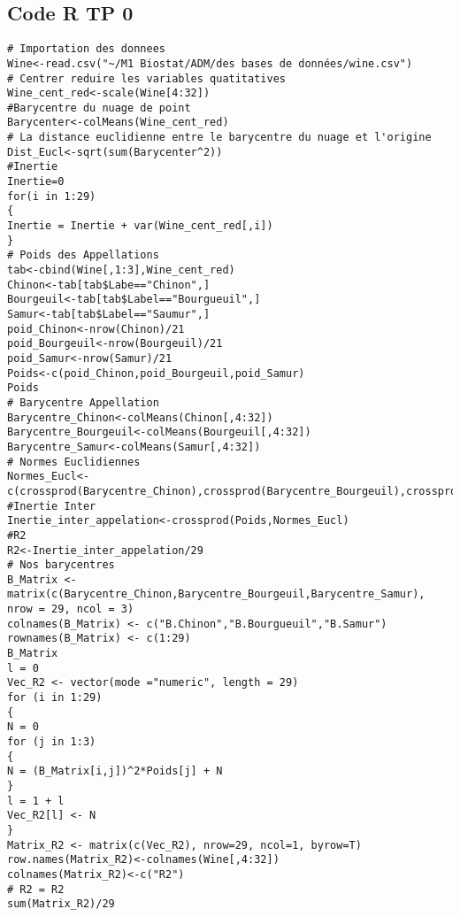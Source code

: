 \begin{appendices}
\chapter{Code R TP 0}
\label{Code R} 
\begin{lstlisting} 
# Importation des donnees
Wine<-read.csv("~/M1 Biostat/ADM/des bases de données/wine.csv")
# Centrer reduire les variables quatitatives
Wine_cent_red<-scale(Wine[4:32])
#Barycentre du nuage de point
Barycenter<-colMeans(Wine_cent_red)
# La distance euclidienne entre le barycentre du nuage et l'origine
Dist_Eucl<-sqrt(sum(Barycenter^2))
#Inertie
Inertie=0
for(i in 1:29)
{
Inertie = Inertie + var(Wine_cent_red[,i])
}
# Poids des Appellations
tab<-cbind(Wine[,1:3],Wine_cent_red)
Chinon<-tab[tab$Labe=="Chinon",]
Bourgeuil<-tab[tab$Label=="Bourgueuil",]
Samur<-tab[tab$Label=="Saumur",]
poid_Chinon<-nrow(Chinon)/21
poid_Bourgeuil<-nrow(Bourgeuil)/21
poid_Samur<-nrow(Samur)/21
Poids<-c(poid_Chinon,poid_Bourgeuil,poid_Samur)
Poids
# Barycentre Appellation
Barycentre_Chinon<-colMeans(Chinon[,4:32])
Barycentre_Bourgeuil<-colMeans(Bourgeuil[,4:32])
Barycentre_Samur<-colMeans(Samur[,4:32])
# Normes Euclidiennes
Normes_Eucl<-c(crossprod(Barycentre_Chinon),crossprod(Barycentre_Bourgeuil),crossprod(Barycentre_Samur))
#Inertie Inter
Inertie_inter_appelation<-crossprod(Poids,Normes_Eucl)
#R2
R2<-Inertie_inter_appelation/29
# Nos barycentres
B_Matrix <- matrix(c(Barycentre_Chinon,Barycentre_Bourgeuil,Barycentre_Samur), nrow = 29, ncol = 3)
colnames(B_Matrix) <- c("B.Chinon","B.Bourgueuil","B.Samur")
rownames(B_Matrix) <- c(1:29)
B_Matrix
l = 0
Vec_R2 <- vector(mode ="numeric", length = 29)
for (i in 1:29)
{
N = 0
for (j in 1:3)
{
N = (B_Matrix[i,j])^2*Poids[j] + N
}
l = 1 + l
Vec_R2[l] <- N
}
Matrix_R2 <- matrix(c(Vec_R2), nrow=29, ncol=1, byrow=T)
row.names(Matrix_R2)<-colnames(Wine[,4:32])
colnames(Matrix_R2)<-c("R2")
# R2 = R2
sum(Matrix_R2)/29
\end{lstlisting} 
\end{appendices}
